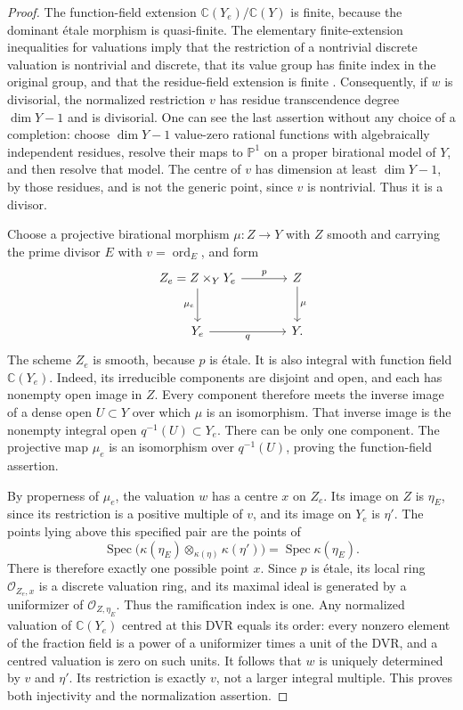 \begin{proof}
The function-field extension
$\mathbb C(Y_e)/\mathbb C(Y)$ is finite, because the dominant
\'etale morphism is quasi-finite.  The elementary
finite-extension inequalities for valuations imply that the
restriction of a nontrivial discrete valuation is nontrivial and
discrete, that its value group has finite index in the original
group, and that the residue-field extension is finite
\cite[Tag~0ASH]{Stacks}.  Consequently, if $w$ is divisorial, the
normalized restriction $v$ has residue transcendence degree
$\dim Y-1$ and is divisorial.  One can see the last assertion without
any choice of a completion: choose $\dim Y-1$ value-zero rational
functions with algebraically independent residues, resolve their
maps to $\mathbb P^1$ on a proper birational model of $Y$, and then
resolve that model.  The centre of $v$ has dimension at least
$\dim Y-1$, by those residues, and is not the generic point, since
$v$ is nontrivial.  Thus it is a divisor.

Choose a projective birational morphism $\mu:Z\to Y$ with $Z$ smooth
and carrying the prime divisor $E$ with $v=\operatorname{ord}_E$,
and form
\[
 \begin{tikzcd}[column sep=large,row sep=large]
 Z_e=Z\times_Y Y_e \arrow[r,"p"] \arrow[d,"\mu_e"']
     & Z \arrow[d,"\mu"] \\
 Y_e \arrow[r,"q"'] & Y.
 \end{tikzcd}
\]
The scheme $Z_e$ is smooth, because $p$ is
\'etale.  It is also integral with function field
$\mathbb C(Y_e)$.  Indeed, its irreducible components are disjoint
and open, and each has nonempty open image in $Z$.  Every component
therefore meets the inverse image of a dense open $U\subset Y$
over which $\mu$ is an isomorphism.  That inverse image is the
nonempty integral open $q^{-1}(U)\subset Y_e$.  There can be only
one component.  The projective map $\mu_e$ is an isomorphism over
$q^{-1}(U)$, proving the function-field assertion.

By properness of $\mu_e$, the valuation $w$ has a centre $x$ on
$Z_e$.  Its image on $Z$ is $\eta_E$, since its restriction is a
positive multiple of $v$, and its image on $Y_e$ is $\eta'$.
The points lying above this specified pair are the points of
\begin{equation}\label{eq:local-residue-point}
 \operatorname{Spec}\bigl(
   \kappa(\eta_E)\otimes_{\kappa(\eta)}\kappa(\eta')\bigr)
       =\operatorname{Spec}\kappa(\eta_E).
\end{equation}
There is therefore exactly one possible point $x$.  Since $p$ is
\'etale, its local ring
$\mathcal O_{Z_e,x}$ is a discrete valuation ring, and its maximal
ideal is generated by a uniformizer of
$\mathcal O_{Z,\eta_E}$.  Thus the ramification index is one.
Any normalized valuation of $\mathbb C(Y_e)$ centred at this DVR
equals its order: every nonzero element of the fraction field is a
power of a uniformizer times a unit of the DVR, and a centred
valuation is zero on such units.  It follows that $w$ is uniquely
determined by $v$ and $\eta'$.  Its restriction is exactly $v$,
not a larger integral multiple.  This proves both injectivity and
the normalization assertion.


\end{proof}
